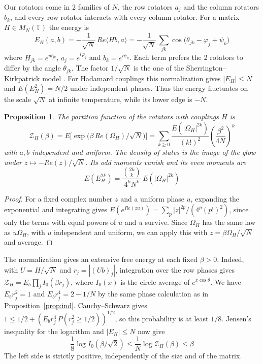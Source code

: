 \documentclass[11pt,a4paper]{article}
\newtheorem{prop}[thm]{Proposition}
\theoremstyle{remark}
\begin{document}
Our rotators come in 2 families of $N$, the row rotators $a_j$ and the column rotators $b_k$, and every row rotator interacts with every column rotator. For a matrix $H\in M_N(\mathbb T)$ the energy is
\[
 E_H(a,b)=-\frac1{\sqrt N}\,Re\langle Hb,a\rangle=-\frac1{\sqrt N}\,\sum_{jk}\cos\big(\theta_{jk}-\varphi_j+\psi_k\big)
\]
where $H_{jk}=e^{i\theta_{jk}}$, $a_j=e^{i\varphi_j}$ and $b_k=e^{i\psi_k}$. Each term prefers the 2 rotators to differ by the angle $\theta_{jk}$. The factor $1/\sqrt N$ is the one of the Sherrington--Kirkpatrick model \cite{ski}. For Hadamard couplings this normalization gives $|E_H|\le N$ and $E(E_H^2)=N/2$ under independent phases. Thus the energy fluctuates on the scale $\sqrt N$ at infinite temperature, while its lower edge is $-N$.

\begin{samepage}
\begin{prop}\label{prop:partition}
The partition function of the rotators with couplings $H$ is
\[
 \mathcal Z_H(\beta)=E\Big[\exp\big(\beta\,Re(\Omega_H)/\sqrt N\big)\Big]=\sum_{k\geq0}\frac{E(|\Omega_H|^{2k})}{(k!)^2}\left(\frac{\beta^2}{4N}\right)^k
\]
with $a,b$ independent and uniform. The density of states is the image of the glow under $z\mapsto-Re(z)/\sqrt N$. Its odd moments vanish and its even moments are
\[
 E(E_H^{2k})=\frac{\binom{2k}{k}}{4^k N^k}\,E(|\Omega_H|^{2k})
\]
\end{prop}
\end{samepage}
\begin{proof}
For a fixed complex number $z$ and a uniform phase $u$, expanding the exponential and integrating gives $E(e^{Re(zu)})=\sum_p|z|^{2p}/(4^p(p!)^2)$, since only the terms with equal powers of $u$ and $\bar u$ survive. Since $\Omega_H$ has the same law as $u\Omega_H$, with $u$ independent and uniform, we can apply this with $z=\beta\Omega_H/\sqrt N$ and average.
\end{proof}

The normalization gives an extensive free energy at each fixed $\beta>0$. Indeed, with $U=H/\sqrt N$ and $r_j=|(Ub)_j|$, integration over the row phases gives $\mathcal Z_H=E_b\prod_j I_0(\beta r_j)$, where $I_0(x)$ is the circle average of $e^{x\cos\theta}$. We have $E_b r_j^2=1$ and $E_b r_j^4=2-1/N$ by the same phase calculation as in Proposition~\ref{prop:ind}. Cauchy--Schwarz gives $1\le1/2+(E_b r_j^4\,P(r_j^2\ge1/2))^{1/2}$, so this probability is at least $1/8$. Jensen's inequality for the logarithm and $|E_H|\le N$ now give
\[
 \frac18\log I_0(\beta/\sqrt2)\le\frac1N\log\mathcal Z_H(\beta)\le\beta
\]
The left side is strictly positive, independently of the size and of the matrix.
\end{document}
